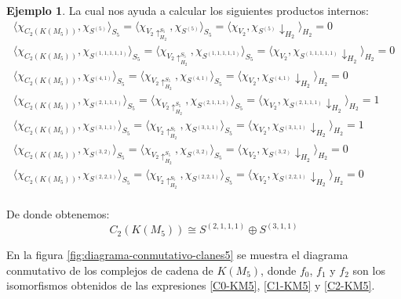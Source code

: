 \documentclass[12pt]{book}
\theoremstyle{definition}
\newtheorem{example}[theorem]{Ejemplo}
\newcounter{in}
\begin{document}
\begin{example}
La cual nos ayuda a calcular los siguientes productos internos:
\begin{eqnarray*}
  \langle\chi_{C_{2}(K(M_{5}))},\chi_{S^{(5)}}\rangle_{S_{5}}=\langle\chi_{V_{2}\uparrow^{S_{5}}_{H_{2}}},\chi_{S^{(5)}}\rangle_{S_{5}}=\langle\chi_{V_{2}},\chi_{S^{(5)}}\downarrow_{H_{2}}\rangle_{H_{2}}=0\\
  \langle\chi_{C_{2}(K(M_{5}))},\chi_{S^{(1,1,1,1,1)}}\rangle_{S_{5}}=\langle\chi_{V_{2}\uparrow^{S_{5}}_{H_{2}}},\chi_{S^{(1,1,1,1,1)}}\rangle_{S_{5}}=\langle\chi_{V_{2}},\chi_{S^{(1,1,1,1,1)}}\downarrow_{H_{2}}\rangle_{H_{2}}=0\\
  \langle\chi_{C_{2}(K(M_{5}))},\chi_{S^{(4,1)}}\rangle_{S_{5}}=\langle\chi_{V_{2}\uparrow^{S_{5}}_{H_{2}}},\chi_{S^{(4,1)}}\rangle_{S_{5}}=\langle\chi_{V_{2}},\chi_{S^{(4,1)}}\downarrow_{H_{2}}\rangle_{H_{2}}=0\\
  \langle\chi_{C_{2}(K(M_{5}))},\chi_{S^{(2,1,1,1)}}\rangle_{S_{5}}=\langle\chi_{V_{2}\uparrow^{S_{5}}_{H_{2}}},\chi_{S^{(2,1,1,1)}}\rangle_{S_{5}}=\langle\chi_{V_{2}},\chi_{S^{(2,1,1,1)}}\downarrow_{H_{2}}\rangle_{H_{2}}=1\\
  \langle\chi_{C_{2}(K(M_{5}))},\chi_{S^{(3,1,1)}}\rangle_{S_{5}}=\langle\chi_{V_{2}\uparrow^{S_{5}}_{H_{2}}},\chi_{S^{(3,1,1)}}\rangle_{S_{5}}=\langle\chi_{V_{2}},\chi_{S^{(3,1,1)}}\downarrow_{H_{2}}\rangle_{H_{2}}=1\\
  \langle\chi_{C_{2}(K(M_{5}))},\chi_{S^{(3,2)}}\rangle_{S_{5}}=\langle\chi_{V_{2}\uparrow^{S_{5}}_{H_{2}}},\chi_{S^{(3,2)}}\rangle_{S_{5}}=\langle\chi_{V_{2}},\chi_{S^{(3,2)}}\downarrow_{H_{2}}\rangle_{H_{2}}=0\\
  \langle\chi_{C_{2}(K(M_{5}))},\chi_{S^{(2,2,1)}}\rangle_{S_{5}}=\langle\chi_{V_{2}\uparrow^{S_{5}}_{H_{2}}},\chi_{S^{(2,2,1)}}\rangle_{S_{5}}=\langle\chi_{V_{2}},\chi_{S^{(2,2,1)}}\downarrow_{H_{2}}\rangle_{H_{2}}=0\\
\end{eqnarray*}

De donde obtenemos:
\begin{equation}
\label{C2-KM5}
C_{2}(K(M_{5}))\cong S^{(2,1,1,1)}\oplus S^{(3,1,1)}
\end{equation}

En la figura \ref{fig:diagrama-conmutativo-clanes5} se muestra el diagrama
conmutativo de los complejos de cadena de $K(M_{5})$, donde $f_{0}$,
$f_{1}$ y $f_{2}$ son los isomorfismos obtenidos de las expresiones
\ref{C0-KM5}, \ref{C1-KM5} y \ref{C2-KM5}.


\end{example}
\end{document}
